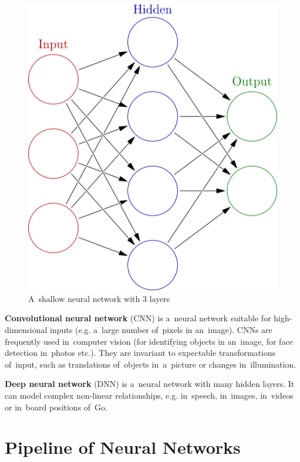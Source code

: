 \begin{figure}[H]
  \centering
  \includegraphics[height=.2\textheight]{../img/colored_neural_network.png}
  \caption{A~shallow neural network with 3 layers}
  \label{fig:shallow-neural-network}
\end{figure}

\textbf{Convolutional neural network} (CNN) is a~neural network suitable for high-dimensional inputs (e.g. a~large number of~pixels in an~image).
CNNs are frequently used in~computer vision (for identifying objects in an~image, for face detection in~photos etc.).
They are invariant to expectable transformations of~input, such as translations of~objects in~a~picture or changes in~illumination.

\textbf{Deep neural network} (DNN) is a~neural network with many hidden layers.
It can model complex non-linear relationships, e.g. in~speech, in~images, in~videos or in~board positions of~Go.

\section{Pipeline of Neural Networks}

